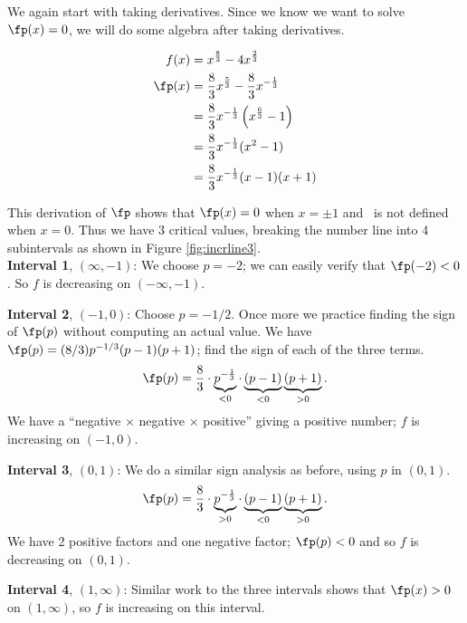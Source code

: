 {We again start with taking derivatives. Since we know we want to solve $\fp(x) = 0$, we will do some algebra after taking derivatives.

\begin{align*}
f(x) &= x^{\frac{8}{3}}-4x^{\frac{2}{3}} \\
\fp(x) &= \frac83 x^{\frac53} - \frac83x^{-\frac13}\\
	&= \frac83x^{-\frac13}\left(x^{\frac63}-1\right)\\
		&=\frac83x^{-\frac13}(x^2-1)\\
		&=\frac83x^{-\frac13}(x-1)(x+1)
\end{align*}

This derivation of $\fp$ shows that $\fp(x) = 0$ when $x=\pm 1$ and \fp\ is not defined when $x=0$. Thus we have 3 critical values, breaking the number line into 4 subintervals as shown in Figure \ref{fig:incrline3}.\\


\noindent\textbf{Interval 1}, $(\infty,-1)$: We choose $p=-2$; we can easily verify that $\fp(-2)<0$. So $f$ is decreasing on $(-\infty,-1)$.

\noindent\textbf{Interval 2}, $(-1,0)$: Choose $p=-1/2$. Once more we practice finding the sign of $\fp(p)$ without computing an actual value. We have $\fp(p) = (8/3)p^{-1/3}(p-1)(p+1)$; find the sign of each of the three terms. 
		$$\fp(p) = \frac 83 \cdot \underbrace{p^{-\frac13}}_{<0}\cdot \underbrace{(p-1)}_{<0}\underbrace{(p+1)}_{>0}.$$
		We have a ``negative $\times$ negative $\times$ positive'' giving a positive number; $f$ is increasing on $(-1,0)$.
		
\noindent\textbf{Interval 3}, $(0,1)$: We do a similar sign analysis as before, using $p$ in $(0,1)$.
		$$\fp(p) = \frac 83 \cdot \underbrace{p^{-\frac13}}_{>0}\cdot \underbrace{(p-1)}_{<0}\underbrace{(p+1)}_{>0}.$$
		We have 2 positive factors and one negative factor; $\fp(p)<0$ and so $f$ is decreasing on $(0,1)$.
		
\noindent\textbf{Interval 4}, $(1,\infty)$: Similar work to the three intervals shows that $\fp(x)>0$ on $(1,\infty)$, so $f$ is increasing on this interval.\\

}
